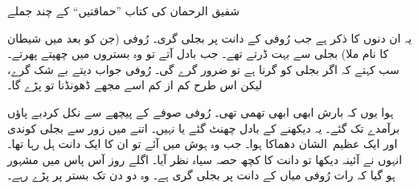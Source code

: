 \documentclass{article}
\begin{document}

   \begin{center} \Large          %
      شفیق الرحمان کی کتاب ''حماقتیں`` کے چند جملے
   \end{center}
   \vspace{2\baselineskip}    %

   یہ ان دنوں کا ذکر ہے جب رُوفی کے دانت پر بجلی گری۔ رُوفی (جن کو بعد میں شیطان کا نام ملا) بجلی سے بہت ڈرتے تھے۔ جب بادل آتے تو وہ بستروں میں چھپتے پھرتے۔ سب کہتے کہ اگر بجلی کو گرنا ہے تو ضرور گرے گی۔ رُوفی جواب دیتے بے شک گرے، لیکن اس طرح کم از کم اسے مجھے ڈھونڈنا تو پڑے گا۔
   
   ہوا یوں کہ بارش ابھی ابھی تھمی تھی۔ رُوفی صوفے کے پیچھے سے نکل کردبے پاؤں برآمدے تک گئے۔ یہ دیکھنے کے بادل چھنٹ گئے یا نہیں۔ اتنے میں زور سے بجلی کوندی اور ایک \hbox{عظیم الشان} دھماکا ہوا۔ جب وہ ہوش میں آئے تو ان کا ایک دانت ہل رہا تھا۔ انہوں نے آئینہ دیکھا تو دانت کا کچھ حصہ سیاہ نظر آیا۔ اگلے روز آس پاس میں مشہور ہو گیا کہ رات رُوفی میاں کے دانت پر بجلی گری ہے۔ وہ دو دن تک بستر پر پڑے رہے۔
\end{document}
